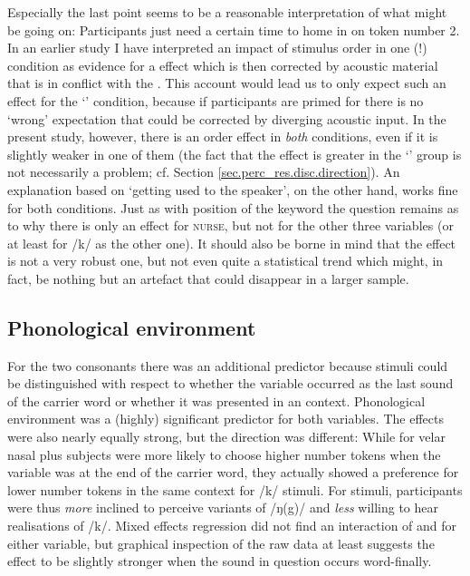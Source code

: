 Especially the last point seems to be a reasonable interpretation of what might be going on: Participants just need a certain time to home in on token number 2.
In an earlier study I have interpreted an impact of stimulus order in one (!) condition as evidence for a  effect which is then corrected by acoustic material that is in conflict with the  \parencite{juskanma}.
This account would lead us to only expect such an effect for the `' condition, because if participants are primed for  there is no `wrong' expectation that could be corrected by diverging acoustic input.
In the present study, however, there is an order effect in \emph{both} conditions, even if it is slightly weaker in one of them (the fact that the effect is greater in the `' group is not necessarily a problem; cf. Section \ref{sec.perc_res.disc.direction}).
An explanation based on `getting used to the speaker', on the other hand, works fine for both conditions.
Just as with position of the keyword the question remains as to why there is only an effect for \textsc{nurse}, but not for the other three variables (or at least for /k/ as the other  one).
It should also be borne in mind that the effect is not a very robust one, but not even quite a statistical trend which might, in fact, be nothing but an artefact that could disappear in a larger sample.

		\subsection{Phonological environment}

For the two consonants there was an additional predictor because stimuli could be distinguished with respect to whether the variable occurred as the last sound of the carrier word or whether it was presented in an  context.
Phonological environment was a (highly) significant predictor for both  variables.
The effects were also nearly equally strong, but the direction was different: While for velar nasal plus subjects were more likely to choose higher number tokens when the variable was at the end of the carrier word, they actually showed a preference for lower number tokens in the same context for /k/ stimuli.
For  stimuli, participants were thus \emph{more} inclined to perceive  variants of /ŋ(g)/ and \emph{less} willing to hear  realisations of /k/.
Mixed effects regression did not find an interaction of  and  for either variable, but graphical inspection of the raw data at least suggests the  effect to be slightly stronger when the sound in question occurs word-finally.

